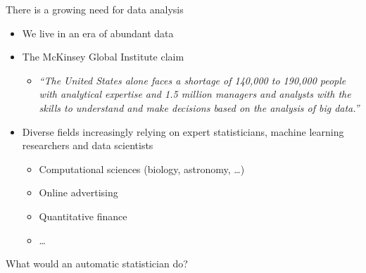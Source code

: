 \begin{frame}{There is a growing need for data analysis}
  \begin{itemize}
    \item We live in an era of abundant data
    \vspace{\baselineskip}
    \item The McKinsey Global Institute claim
    \begin{itemize}
      \item \emph{``The United States alone faces a shortage of 140,000 to 190,000 people with analytical expertise and 1.5 million managers and analysts with the skills to understand and make decisions based on the analysis of big data.''}
    \end{itemize}
    \vspace{\baselineskip}
    \item Diverse fields increasingly relying on expert statisticians, machine learning researchers and data scientists \eg
    \begin{itemize}
       \item Computational sciences (\eg biology, astronomy, \ldots)
       \item Online advertising
       \item Quantitative finance
       \item \ldots
     \end{itemize}
  \end{itemize}
\end{frame}

\begin{frame}{What would an automatic statistician do?}
  
\end{frame}

